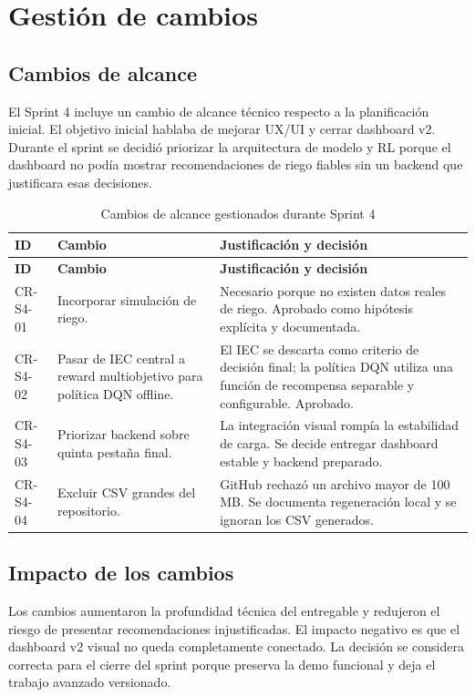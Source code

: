 \documentclass[11pt,a4paper]{article}
\begin{document}
\newpage

\section{Gestión de cambios}

\subsection{Cambios de alcance}

El Sprint 4 incluye un cambio de alcance técnico respecto a la planificación inicial. El objetivo inicial hablaba de mejorar UX/UI y cerrar dashboard v2. Durante el sprint se decidió priorizar la arquitectura de modelo y RL porque el dashboard no podía mostrar recomendaciones de riego fiables sin un backend que justificara esas decisiones.

\begin{longtable}{p{}p{}p{}}
\caption{Cambios de alcance gestionados durante Sprint 4}\\
\toprule
\textbf{ID} & \textbf{Cambio} & \textbf{Justificación y decisión} \\
\midrule
\endfirsthead
\toprule
\textbf{ID} & \textbf{Cambio} & \textbf{Justificación y decisión} \\
\midrule
\endhead
CR-S4-01 & Incorporar simulación de riego. & Necesario porque no existen datos reales de riego. Aprobado como hipótesis explícita y documentada. \\
CR-S4-02 & Pasar de IEC central a reward multiobjetivo para política DQN offline. & El IEC se descarta como criterio de decisión final; la política DQN utiliza una función de recompensa separable y configurable. Aprobado. \\
CR-S4-03 & Priorizar backend sobre quinta pestaña final. & La integración visual rompía la estabilidad de carga. Se decide entregar dashboard estable y backend preparado. \\
CR-S4-04 & Excluir CSV grandes del repositorio. & GitHub rechazó un archivo mayor de 100 MB. Se documenta regeneración local y se ignoran los CSV generados. \\
\bottomrule
\end{longtable}

\subsection{Impacto de los cambios}

Los cambios aumentaron la profundidad técnica del entregable y redujeron el riesgo de presentar recomendaciones injustificadas. El impacto negativo es que el dashboard v2 visual no queda completamente conectado. La decisión se considera correcta para el cierre del sprint porque preserva la demo funcional y deja el trabajo avanzado versionado.
\end{document}
